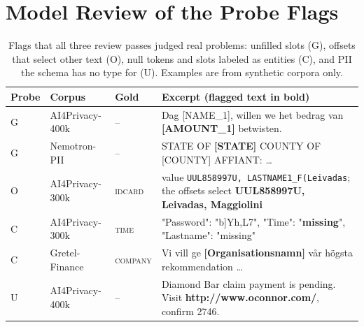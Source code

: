 \documentclass[11pt]{article}
\begin{document}
\FloatBarrier
\section{Model Review of the Probe Flags}
\label{app:validation}

\begin{table}[h]
\centering
\small
\setlength{\tabcolsep}{3pt}
\caption{Model review per corpus and probe: share of sampled flags
judged real by the majority of three passes (Wilson 95\% CI), and that
share applied to all flags of the cell. --: all answers identical.}
\label{tab:validation_full}
\end{table}

\begin{table}[h]
\centering
\small
\setlength{\tabcolsep}{4pt}
\begin{tabular}{@{}l l l p{}@{}}
\toprule
Probe & Corpus & Gold & Excerpt (flagged text in bold) \\
\midrule
G & AI4Privacy-400k & -- & Dag [NAME\_1], willen we het bedrag van \textbf{[AMOUNT\_1]} betwisten. \\
G & Nemotron-PII & -- & STATE OF \textbf{[STATE]} \quad COUNTY OF [COUNTY] \quad AFFIANT: \ldots \\
O & AI4Privacy-300k & \textsc{idcard} & value \texttt{UUL858997U, LASTNAME1\_F(Leivadas}; the offsets select \textbf{UUL858997U, Leivadas, Maggiolini} \\
C & AI4Privacy-300k & \textsc{time} & "Password": "b]Yh,L7", "Time": "\textbf{missing}", "Lastname": "missing" \\
C & Gretel-Finance & \textsc{company} & Vi vill ge \textbf{[Organisationsnamn]} vår högsta rekommendation \ldots \\
U & AI4Privacy-400k & -- & Diamond Bar claim payment is pending. Visit \textbf{http://www.oconnor.com/}, confirm 2746. \\
\bottomrule
\end{tabular}
\caption{Flags that all three review passes judged real problems: unfilled
slots (G), offsets that select other text (O), null tokens and slots
labeled as entities (C), and PII the schema has no type for (U).
Examples are from synthetic corpora only.}
\label{tab:flag_examples}
\end{table}
\end{document}
